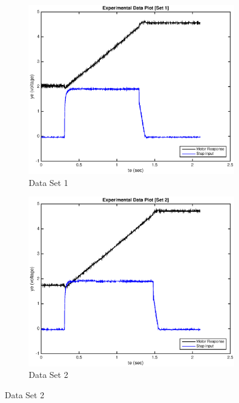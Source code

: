\documentclass[11pt,a4paper]{article}
\begin{document}
\begin{enumerate}
\begin{figure}[H]
  \begin{subfigure}{0.5\textwidth}
  \includegraphics[width=0.9\linewidth]{Matlab_Code/Figures/B1_dataset1.eps} 
  \caption{Data Set 1}
  \label{fig:subim1}
  \end{subfigure}
  \begin{subfigure}{0.5\textwidth}
  \includegraphics[width=0.9\linewidth]{Matlab_Code/Figures/B1_dataset2.eps}
  \caption{Data Set 2}
  \label{fig:subim2}
  \end{subfigure}
  

\end{figure}
\end{enumerate}
\end{document}
